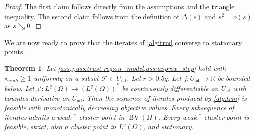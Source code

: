 \documentclass[11pt]{article}
\newcommand{\R}{\mathbb{R}}
\newcommand{\calF}{\mathcal{F}}
\DeclareMathOperator*{\BV}{BV}
\newcommand{\feas}{U_{\textrm{ad}}}
\newtheorem{theorem}{Theorem}[section]
\theoremstyle{definition}
\theoremstyle{remark}
\begin{document}
\begin{proof}
The first claim follows directly from the assumptions
and the triangle inequality. The second claim follows
from the definition of $\Delta(s)$ and $s^2 = o(s)$
as $s \searrow 0$.
\end{proof}
%
We are now ready to prove that the iterates of \cref{alg:trm} converge to stationary points.
%
\begin{theorem}\label{thm:asymptotics}
Let 
\cref{ass:j,ass:trust-region_model,ass:approx_step} 
hold with $\kappa_{umh} \ge 1$ uniformly on a subset 
$\calF \subset \feas$. Let $r > 0.5q$.
Let $j : \feas \to \R$ be bounded below.
Let $j' : L^q(\Omega) \to (L^q(\Omega))^*$ be
continuously differentiable on $\feas$ with
bounded derivative on $\feas$.
Then the sequence of iterates produced by
\cref{alg:trm} is feasible with monotonically
decreasing objective values. Every subsequence
of iterates admits a weak-$^*$ cluster point in $\BV(\Omega)$. Every weak-$^*$ cluster point
is feasible, strict,
also a cluster point in $L^q(\Omega)$,
and stationary.
\end{theorem}
\end{document}
